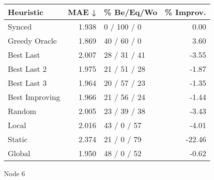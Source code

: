 \begin{tabular}{lrlr}
\toprule
\textbf{Heuristic} & \textbf{MAE ↓} & \textbf{\% Be/Eq/Wo} & \textbf{\% Improv.} \\
\midrule
            Synced &          1.938 &          0 / 100 / 0 &                0.00 \\
     Greedy Oracle &          1.869 &          40 / 60 / 0 &                3.60 \\
         Best Last &          2.007 &         28 / 31 / 41 &               -3.55 \\
       Best Last 2 &          1.975 &         21 / 51 / 28 &               -1.87 \\
       Best Last 3 &          1.964 &         20 / 57 / 23 &               -1.35 \\
    Best Improving &          1.966 &         21 / 56 / 24 &               -1.44 \\
            Random &          2.005 &         23 / 39 / 38 &               -3.43 \\
             Local &          2.016 &          43 / 0 / 57 &               -4.01 \\
            Static &          2.374 &          21 / 0 / 79 &              -22.46 \\
            Global &          1.950 &          48 / 0 / 52 &               -0.62 \\
\bottomrule
\end{tabular}
\caption{Node 6}
\label{tab:hr_non_lr05_le1_bs2_6}

